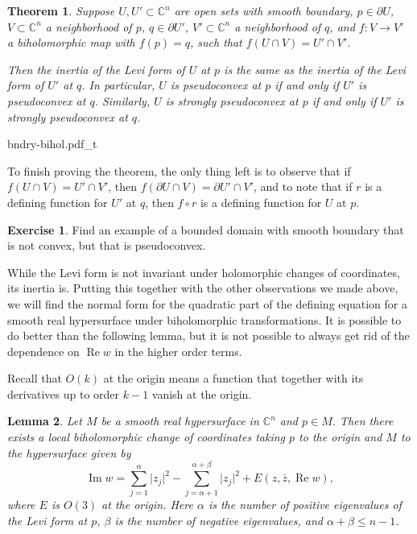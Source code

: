 \documentclass[12pt,openany]{book}
\renewcommand{\Re}{\operatorname{Re}}
\renewcommand{\Im}{\operatorname{Im}}
\newcommand{\sabs}[1]{\lvert {#1} \rvert}
\newcommand{\C}{{\mathbb{C}}}
\theoremstyle{plain}
\newtheorem{thm}{Theorem}[section]
\newtheorem{lemma}[thm]{Lemma}
\theoremstyle{remark}
\theoremstyle{definition}
\newenvironment{exbox}{%
    \def\FrameCommand{\vrule width 1pt \relax\hspace{10pt}}%
    \MakeFramed {\advance \hsize -\width \FrameRestore}%
}{%
    \endMakeFramed
}
\newenvironment{myfig}{%
    \begin{center}
}{%
    \end{center}
}
\theoremstyle{exercise}
\newtheorem{exercise}{Exercise}[section]
\theoremstyle{example}
\begin{document}
\begin{thm}
Suppose $U, U' \subset \C^n$ are open sets with smooth boundary,
$p \in \partial U$, $V \subset \C^n$ a neighborhood of $p$,
$q \in \partial U'$, $V' \subset \C^n$ a neighborhood of $q$,
and $f \colon V \to V'$ a biholomorphic map with $f(p) = q$, such that
$f(U \cap V) = U' \cap V'$.

Then the inertia of the Levi form of $U$ at $p$ is the same as the inertia of
the Levi form of $U'$ at $q$.
In particular, $U$ is pseudoconvex at $p$ if and only if $U'$ is pseudoconvex at $q$.
Similarly,
$U$ is strongly pseudoconvex at $p$ if and only if $U'$ is strongly pseudoconvex at $q$.
\end{thm}

\begin{myfig}
{bndry-bihol.pdf_t}
\end{myfig}

To finish proving the theorem, the only thing left is to observe that if
$f(U \cap V) = U' \cap V'$, then $f(\partial U \cap V) = \partial U' \cap
V'$, and to note that if $r$ is a defining function for $U'$ at $q$,
then $f \circ r$ is a defining function for $U$ at $p$.

\begin{exbox}
\begin{exercise}
Find an example of a bounded domain with smooth boundary that is not convex,
but that is pseudoconvex.
\end{exercise}
\end{exbox}

While the Levi form is not invariant under holomorphic changes of coordinates,
its inertia is.
Putting this together with the other observations we made above,
we will find the normal form for the
quadratic part of the defining equation for a smooth real hypersurface
under biholomorphic transformations.
It is possible to do better than the following lemma, but it is not possible
to always get rid of the dependence on $\Re w$ in the higher order terms.

Recall that $O(k)$ at the origin means
a function that together with its derivatives up to order $k-1$ vanish
at the origin.

\begin{lemma} \label{lemma:normformquad}
Let $M$ be a smooth real hypersurface in $\C^n$ and $p \in M$.  Then there
exists a local biholomorphic change of coordinates taking $p$ to the origin
and $M$ to the hypersurface given by
\begin{equation*}
\Im w = \sum_{j=1}^\alpha \sabs{z_j}^2 - \sum_{j=\alpha+1}^{\alpha+\beta}
\sabs{z_j}^2 +
E(z,\bar{z},\Re w) ,
\end{equation*}
where $E$ is $O(3)$ at the origin.
Here $\alpha$ is the number of positive eigenvalues of the Levi form at $p$,
$\beta$ is the number of negative eigenvalues, and $\alpha+\beta \leq
n-1$.
\end{lemma}
\end{document}
